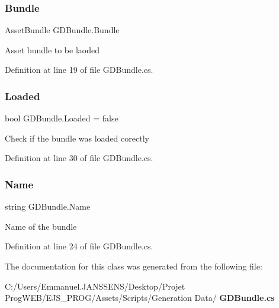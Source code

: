 \mbox{\label{class_g_d_bundle_a9f5c5cf5caa10f7e5f28155ee910ae53}} 
\subsubsection{Bundle}
{\footnotesize\ttfamily Asset\+Bundle G\+D\+Bundle.\+Bundle}



Asset bundle to be laoded 



Definition at line 19 of file G\+D\+Bundle.\+cs.

\mbox{\label{class_g_d_bundle_ab1e5a1eb5baa9c02fad7c5037643aad1}} 
\subsubsection{Loaded}
{\footnotesize\ttfamily bool G\+D\+Bundle.\+Loaded = false}



Check if the bundle was loaded corectly 



Definition at line 30 of file G\+D\+Bundle.\+cs.

\mbox{\label{class_g_d_bundle_a4033b0ef1d442721b2dda101f4c2fcc7}} 
\subsubsection{Name}
{\footnotesize\ttfamily string G\+D\+Bundle.\+Name}



Name of the bundle 



Definition at line 24 of file G\+D\+Bundle.\+cs.



The documentation for this class was generated from the following file\+:\begin{DoxyCompactItemize}
\item 
C\+:/\+Users/\+Emmanuel.\+J\+A\+N\+S\+S\+E\+N\+S/\+Desktop/\+Projet Prog\+W\+E\+B/\+E\+J\+S\+\_\+\+P\+R\+O\+G/\+Assets/\+Scripts/\+Generation Data/\textbf{ G\+D\+Bundle.\+cs}\end{DoxyCompactItemize}
